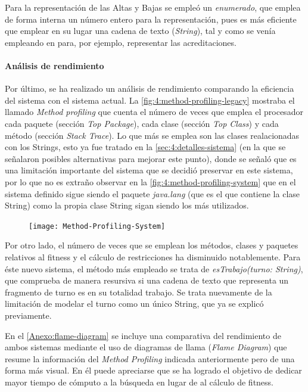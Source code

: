 Para la representación de las Altas y Bajas se empleó un \textit{enumerado}, que emplea de forma interna un número entero para la representación, pues es más eficiente que emplear en su lugar una cadena de texto (\textit{String}), tal y como se venía empleando en \legacy{} para, por ejemplo, representar las acreditaciones.

\paragraph{Análisis de rendimiento}
Por último, se ha realizado un análisis de rendimiento comparando la eficiencia del sistema \legacy{} con el sistema actual. La \autoref{fig:4:method-profiling-legacy} mostraba el llamado \textit{Method profiling} que cuenta el número de veces que emplea el procesador cada paquete (sección \textit{Top Package}), cada clase (sección \textit{Top Class}) y cada método (sección \textit{Stack Trace}). Lo que más se emplea son las clases realacionadas con los Strings, esto ya fue tratado en la \autoref{sec:4:detalles-sistema} (en la que se señalaron posibles alternativas para mejorar este punto), donde se señaló que es una limitación importante del sistema que se decidió preservar en este sistema, por lo que no es extraño observar en la \autoref{fig:4:method-profiling-system} que en el sistema definido sigue siendo el paquete \textit{java.lang} (que es el que contiene la clase String) como la propia clase String sigan siendo los más utilizados.

\begin{figure}
	\centering
	\texttt{[image: Method-Profiling-System]}
	\caption{}
	\label{fig:4:method-profiling-system}
\end{figure}



Por otro lado, el número de veces que se emplean los métodos, clases y paquetes relativos al fitness y el cálculo de restricciones ha disminuido notablemente. Para éste nuevo sistema, el método más empleado se trata de \textit{esTrabajo(turno: String)}, que comprueba de manera resursiva si una cadena de texto que representa un fragmento de turno es en su totalidad trabajo. Se trata nuevamente de la limitación de modelar el turno como un único String, que ya se explicó previamente.

En el \autoref{Anexo:flame-diagram} se incluye una comparativa del rendimiento de ambos sistemas mediante el uso de diagramas de llama (\textit{Flame Diagram}) que resume la información del \textit{Method Profiling} indicada anteriormente pero de una forma más visual. En él puede apreciarse que se ha logrado el objetivo de dedicar mayor tiempo de cómputo a la búsqueda en lugar de al cálculo de fitness.

